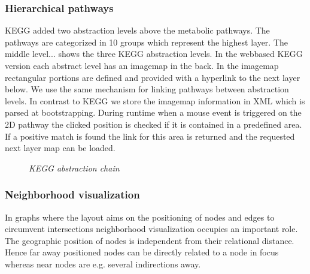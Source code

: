 \subsubsection{Hierarchical pathways}

KEGG added two abstraction levels above the metabolic pathways. The pathways are categorized in 10 groups which represent the highest layer. The middle level...
 shows the three KEGG abstraction levels. 
In the webbased KEGG version each abstract level has an imagemap in the back. In the imagemap rectangular portions are defined and provided with a hyperlink to the next layer below. We use the same mechanism for linking pathways between abstraction levels. In contrast to KEGG we store the imagemap information in XML which is parsed at bootstrapping. During runtime when a mouse event is triggered on the 2D pathway the clicked position is checked if it is contained in a predefined area. If a positive match is found the link for this area is returned and the requested next layer map can be loaded.

\begin{figure}[ht]
\centering
{} 
\caption[KEGG abstraction chain]{\textit{KEGG abstraction chain}} 
\label{gfx:KEGG_abstraction_chain}
\end{figure}

\subsubsection{Neighborhood visualization}

In graphs where the layout aims on the positioning of nodes and edges to circumvent intersections neighborhood visualization occupies an important role. The geographic position of nodes is independent from their relational distance. Hence far away positioned nodes can be directly related to a node in focus whereas near nodes are e.g. several indirections away. 

